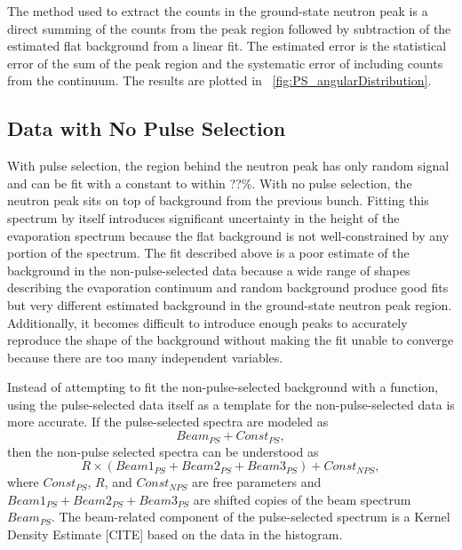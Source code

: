The method used to extract the counts in the ground-state neutron peak is a direct summing of the counts from the peak region followed by subtraction of the estimated flat background from a linear fit.  The estimated error is the statistical error of the sum of the peak region and the systematic error of including counts from the continuum.  The results are plotted in {\fig}~\ref{fig:PS_angularDistribution}.


\subsection{Data with No Pulse Selection}
With pulse selection, the region behind the neutron peak has only random signal and can be fit with a constant to within ??\%.  With no pulse selection, the neutron peak sits on top of background from the previous bunch.  Fitting this spectrum by itself introduces significant uncertainty in the height of the evaporation spectrum because the flat background is not well-constrained by any portion of the spectrum.  The fit described above is a poor estimate of the background in the non-pulse-selected data because a wide range of shapes describing the evaporation continuum and random background produce good fits but very different estimated background in the ground-state neutron peak region.  Additionally, it becomes difficult to introduce enough peaks to accurately reproduce the shape of the background without making the fit unable to converge because there are too many independent variables. 

Instead of attempting to fit the non-pulse-selected background with a function, using the pulse-selected data itself as a template for the non-pulse-selected data is more accurate.  If the pulse-selected spectra are modeled as
\begin{equation}
Beam_{PS} + Const_{PS},
\end{equation}
then the non-pulse selected spectra can be understood as
\begin{equation}
R\times (Beam1_{PS}+Beam2_{PS}+Beam3_{PS}) + Const_{NPS},
\end{equation}
where $Const_{PS}$, $R$, and $Const_{NPS}$ are free parameters and $Beam1_{PS}+Beam2_{PS}+Beam3_{PS}$ are shifted copies of the beam spectrum $Beam_{PS}$.  The beam-related component of the pulse-selected spectrum is a Kernel Density Estimate [CITE] based on the data in the histogram.  

